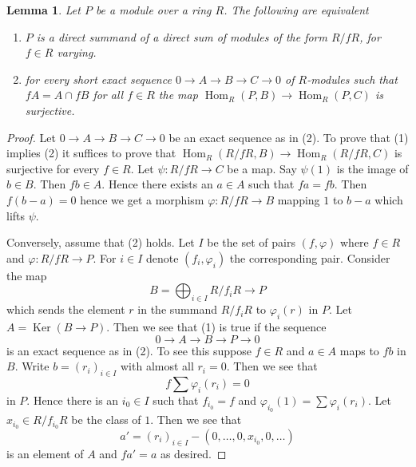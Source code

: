 \documentclass[10pt,a4paper]{amsart}
\theoremstyle{plain}
\newtheorem{lemma}[subsection]{Lemma}
\theoremstyle{definition}
\theoremstyle{remark}
\numberwithin{equation}{subsection}
\def\Hom{\mathop{\mathrm{Hom}}\nolimits}
\def\Ker{\mathop{\mathrm{Ker}}}
\newenvironment{reference}{\comment}{\endcomment}
\begin{document}
\begin{lemma}
\label{lemma-characterize-PD-modules}
\begin{reference}
\cite[Corollary 1]{Warfield-Purity}
\end{reference}
Let $P$ be a module over a ring $R$. The following are equivalent
\begin{enumerate}
\item $P$ is a direct summand of a direct sum of modules of the
form $R/fR$, for $f \in R$ varying.
\item for every short exact sequence $0 \to A \to B \to C \to 0$
of $R$-modules such that $fA = A \cap fB$ for all $f \in R$
the map $\Hom_R(P, B) \to \Hom_R(P, C)$ is surjective.
\end{enumerate}
\end{lemma}

\begin{proof}
Let $0 \to A \to B \to C \to 0$ be an exact sequence as in (2).
To prove that (1) implies (2) it suffices to prove that
$\Hom_R(R/fR, B) \to \Hom_R(R/fR, C)$ is surjective for every $f \in R$.
Let $\psi : R/fR \to C$ be a map. Say $\psi(1)$ is the image
of $b \in B$. Then $fb \in A$. Hence there exists an $a \in A$
such that $fa = fb$. Then $f(b - a) = 0$ hence we get a morphism
$\varphi : R/fR \to B$ mapping $1$ to $b - a$ which lifts $\psi$.

\medskip\noindent
Conversely, assume that (2) holds. Let $I$ be the set of pairs
$(f, \varphi)$ where $f \in R$ and $\varphi : R/fR \to P$. For
$i \in I$ denote $(f_i, \varphi_i)$ the corresponding pair.
Consider the map
$$
B = \bigoplus\nolimits_{i \in I} R/f_iR \longrightarrow P
$$
which sends the element $r$ in the summand $R/f_iR$ to $\varphi_i(r)$ in $P$.
Let $A = \Ker(B \to P)$. Then we see that (1) is true if the sequence
$$
0 \to A \to B \to P \to 0
$$
is an exact sequence as in (2). To see this suppose $f \in R$ and
$a \in A$ maps to $f b$ in $B$. Write $b = (r_i)_{i \in I}$ with
almost all $r_i = 0$. Then we see that
$$
f\sum \varphi_i(r_i) = 0
$$
in $P$. Hence there is an $i_0 \in I$ such that $f_{i_0} = f$ and
$\varphi_{i_0}(1) = \sum \varphi_i(r_i)$. Let $x_{i_0} \in R/f_{i_0}R$
be the class of $1$. Then we see that
$$
a' = (r_i)_{i \in I} - (0, \ldots, 0, x_{i_0}, 0, \ldots )
$$
is an element of $A$ and $fa' = a$ as desired.
\end{proof}
\end{document}
